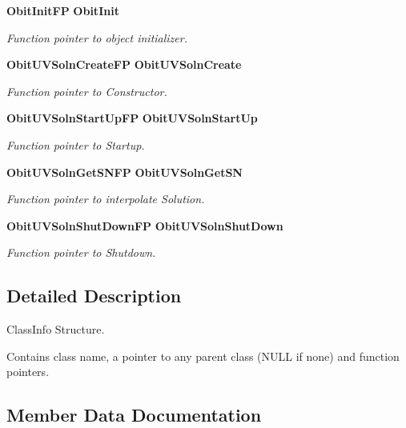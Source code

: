 \begin{CompactItemize}
{\bf Obit\-Init\-FP} {\bf Obit\-Init}
\begin{CompactList}\small\item\em Function pointer to object initializer. \item\end{CompactList}\item 
{\bf Obit\-UVSoln\-Create\-FP} {\bf Obit\-UVSoln\-Create}
\begin{CompactList}\small\item\em Function pointer to Constructor. \item\end{CompactList}\item 
{\bf Obit\-UVSoln\-Start\-Up\-FP} {\bf Obit\-UVSoln\-Start\-Up}
\begin{CompactList}\small\item\em Function pointer to Startup. \item\end{CompactList}\item 
{\bf Obit\-UVSoln\-Get\-SNFP} {\bf Obit\-UVSoln\-Get\-SN}
\begin{CompactList}\small\item\em Function pointer to interpolate Solution. \item\end{CompactList}\item 
{\bf Obit\-UVSoln\-Shut\-Down\-FP} {\bf Obit\-UVSoln\-Shut\-Down}
\begin{CompactList}\small\item\em Function pointer to Shutdown. \item\end{CompactList}\end{CompactItemize}


\subsection{Detailed Description}
Class\-Info Structure. 

Contains class name, a pointer to any parent class (NULL if none) and function pointers. 



\subsection{Member Data Documentation}
